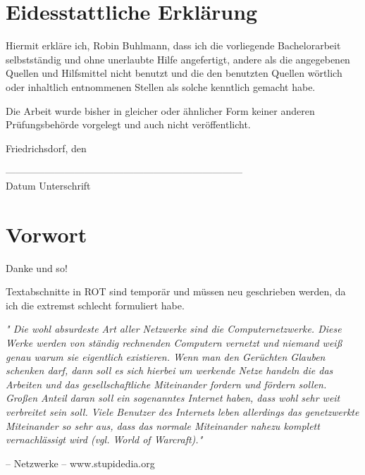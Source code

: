 \newpage
\chapter*{Eidesstattliche Erklärung}

Hiermit erkläre ich, Robin Buhlmann, dass ich die vorliegende Bachelorarbeit selbstständig und ohne unerlaubte Hilfe angefertigt, andere als die angegebenen Quellen und Hilfsmittel nicht benutzt und die den benutzten Quellen wörtlich oder inhaltlich entnommenen Stellen als solche kenntlich gemacht habe.

Die Arbeit wurde bisher in gleicher oder ähnlicher Form keiner anderen Prüfungsbehörde vorgelegt und auch nicht veröffentlicht.


\vspace{1cm}

Friedrichsdorf, den

\vspace{1cm}

------------------------------------\hspace{6cm}------------------------------------\\
Datum \hspace{9,4cm} Unterschrift

\newpage

\chapter*{Vorwort}
\setlength{\parindent}{0em}
\setlength{\parskip}{1em}

Danke und so!\par

\color{red}
Textabschnitte in ROT sind temporär und müssen neu geschrieben werden, da ich die extremst schlecht formuliert habe.
\color{black}

\begin{displayquote} 
\textit{"
Die wohl absurdeste Art aller Netzwerke sind die Computernetzwerke. Diese Werke werden von ständig rechnenden Computern vernetzt und niemand weiß genau warum sie eigentlich existieren. Wenn man den Gerüchten Glauben schenken darf, dann soll es sich hierbei um werkende Netze handeln die das Arbeiten und das gesellschaftliche Miteinander fordern und fördern sollen. Großen Anteil daran soll ein sogenanntes Internet haben, dass wohl sehr weit verbreitet sein soll. Viele Benutzer des Internets leben allerdings das genetzwerkte Miteinander so sehr aus, dass das normale Miteinander nahezu komplett vernachlässigt wird (vgl. World of Warcraft)."}\par
\hfill
 -- Netzwerke -- www.stupidedia.org
\end{displayquote}

